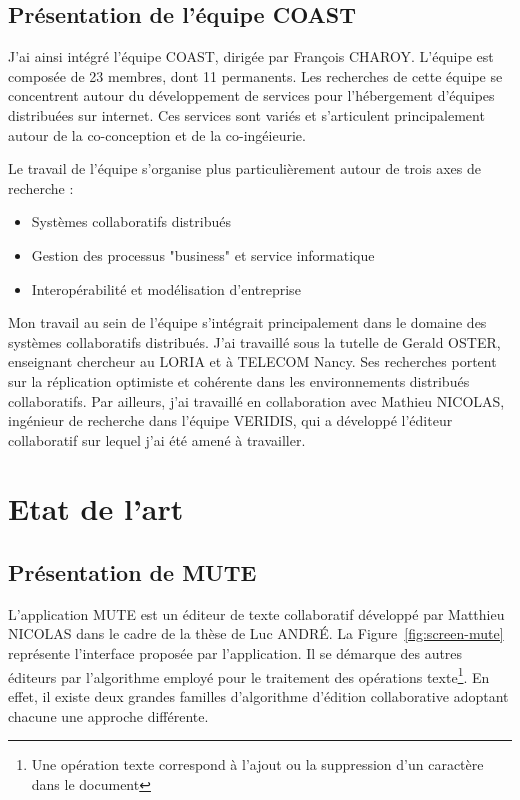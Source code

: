\documentclass{tnreport}
\begin{document}
\section{Présentation de l'équipe COAST} 

J'ai ainsi intégré l'équipe COAST, dirigée par François CHAROY. L'équipe est composée de 23 membres, dont 11 permanents. Les recherches de cette équipe se concentrent autour du développement de services pour l'hébergement d'équipes distribuées sur internet. Ces services sont variés et s'articulent principalement autour de la co-conception et de la co-ingéieurie.

Le travail de l'équipe s'organise plus particulièrement autour de trois axes de recherche :

\begin{itemize}
  \item Systèmes collaboratifs distribués
  \item Gestion des processus "business" et service informatique
  \item Interopérabilité et modélisation d'entreprise
\end{itemize}

Mon travail au sein de l'équipe s'intégrait principalement dans le domaine des systèmes collaboratifs distribués. J'ai travaillé sous la tutelle de Gerald OSTER, enseignant chercheur au LORIA et à TELECOM Nancy. Ses recherches portent sur la réplication optimiste et cohérente dans les environnements distribués collaboratifs. Par ailleurs, j'ai travaillé en collaboration avec Mathieu NICOLAS, ingénieur de recherche dans l'équipe VERIDIS, qui a développé l'éditeur collaboratif sur lequel j'ai été amené à travailler.  

\cleardoublepage


\chapter{Etat de l'art}

\section{Présentation de MUTE}

L'application MUTE est un éditeur de texte collaboratif développé par Matthieu NICOLAS dans le cadre de la thèse de Luc ANDRÉ. La Figure~\ref{fig:screen-mute} représente l'interface proposée par l'application. Il se démarque des autres éditeurs par l'algorithme employé pour le traitement des opérations texte\footnote{Une opération texte correspond à l'ajout ou la suppression d'un caractère dans le document}. En effet, il existe deux grandes familles d'algorithme d'édition collaborative adoptant chacune une approche différente. 
\end{document}
